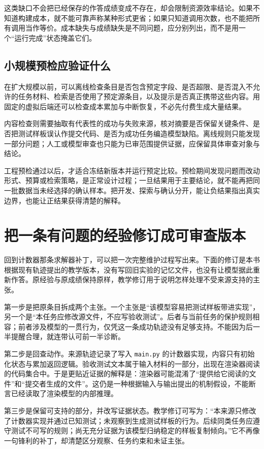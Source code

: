 这类缺口不会把已经保存的作答成绩变成不存在，却会限制资源效率结论。如果不知道构建成本，就不能可靠声称某种形式更省；如果只知道调用次数，也不能把所有调用当作等价。成本缺失与成绩缺失是不同问题，应分别列出，而不是用一个“运行完成”状态掩盖它们。

\subsection{小规模预检应验证什么}

在扩大规模以前，可以离线检查条目是否包含预定字段、是否超限、是否混入不允许的任务材料、检索是否使用了预定源条目，以及提示是否真正携带这些内容。用固定的虚拟后端还可以检查成本累加与中断恢复，不必先付费生成大量结果。

内容检查则需要抽取有代表性的成功与失败来源，核对摘要是否保留关键条件、是否把测试样板误认作提交代码、是否为成功任务编造模型缺陷。离线规则只能发现一部分问题；人工或模型审查也只能为已审范围提供证据，应保留具体审查对象与结论。

工程预检通过以后，才适合冻结新版本并运行预定比较。预检期间发现问题而改动形式、预算或检索策略，是正常设计过程；一旦结果用于主要结论，就不能再把同一批数据当未经选择的确认样本。把开发、探索与确认分开，能让负结果指出真实边界，也能让正结果获得清楚的解释。


\section{把一条有问题的经验修订成可审查版本}
\label{sec:ch05-revision-card}

回到计数器那条求解器补丁，可以把一次完整维护过程写出来。下面的修订是本书根据现有轨迹提出的教学版本，没有写回旧实验的记忆文件，也没有让模型据此重新作答。原经验与原成绩保持原样，教学修订用于说明怎样处理不受来源支持的主张。

第一步是把原条目拆成两个主张。一个主张是“该模型容易把测试样板带进实现”，另一个是“本任务应修改源文件，不应写验收测试”。后者与当前任务的保护规则相容；前者涉及模型的一贯行为，仅凭这一条成功轨迹没有足够支持。不能因为后一半提醒合理，就连带认可前一半诊断。

第二步是回查动作。来源轨迹记录了写入 \texttt{main.py} 的计数器实现，内容只有初始化状态与累加返回逻辑。验收测试文本属于输入材料的一部分，出现在渲染器阅读的代码集合中。于是更贴近证据的解释是：渲染器可能混淆了“提供给它阅读的文件”和“提交者生成的文件”。这仍是一种根据输入与输出提出的机制假设，不能断言已经读取了渲染模型的内部推理。

第三步是保留可支持的部分，并改写证据状态。教学修订可写为：“本来源只修改了计数器实现并通过已知测试；未观察到生成测试样板的行为。后续同类任务应遵守测试不可写的规则；尚无充分证据为该模型归纳稳定的样板复制倾向。”它不再像一句锋利的补丁，却清楚区分观察、任务约束和未证主张。


